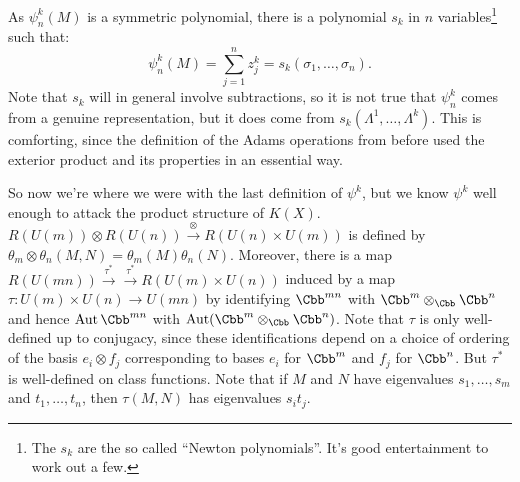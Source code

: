 As $\psi^k_n(M)$ is a symmetric polynomial, there is a polynomial $s_k$ in $n$ variables\footnote{The $s_k$ are the so called ``Newton polynomials''. It's good entertainment to work out a few.} such that:
\[\psi^k_n(M)=\sum_{j=1}^n z_j^k=s_k(\sigma_1,\ldots,\sigma_n).\]
Note that $s_k$ will in general involve subtractions, so it is not true that $\psi^k_n$ comes from a genuine representation, but it does come from $s_k(\Lambda^1, \ldots, \Lambda^k)$.  This is comforting, since the definition of the Adams operations from before used the exterior product and its properties in an essential way.

So now we're where we were with the last definition of $\psi^k$, but we know $\psi^k$ well enough to attack the product structure of $K(X)$.  $R(U(m)) \otimes R(U(n)) \xrightarrow{\otimes} R(U(n) \times U(m))$ is defined by $\theta_m \otimes \theta_n(M, N) = \theta_m(M) \theta_n(N)$.  Moreover, there is a map $R(U(mn)) \xrightarrow{\tau^*} \xrightarrow{\tau^*} R(U(m) \times U(n))$ induced by a map $\tau: U(m) \times U(n) \to U(mn)$ by identifying $\Cbb^{mn}$ with $\Cbb^m \otimes_\Cbb \Cbb^n$ and hence $\Aut \Cbb^{mn}$ with $\Aut (\Cbb^m \otimes_\Cbb \Cbb^n)$.  Note that $\tau$ is only well-defined up to conjugacy, since these identifications depend on a choice of ordering of the basis $e_i \otimes f_j$ corresponding to bases $e_i$ for $\Cbb^m$ and $f_j$ for $\Cbb^n$.  But $\tau^*$ is well-defined on class functions.  Note that if $M$ and $N$ have eigenvalues $s_1, \ldots, s_m$ and $t_1, \ldots, t_n$, then $\tau(M, N)$ has eigenvalues $s_i t_j$.

